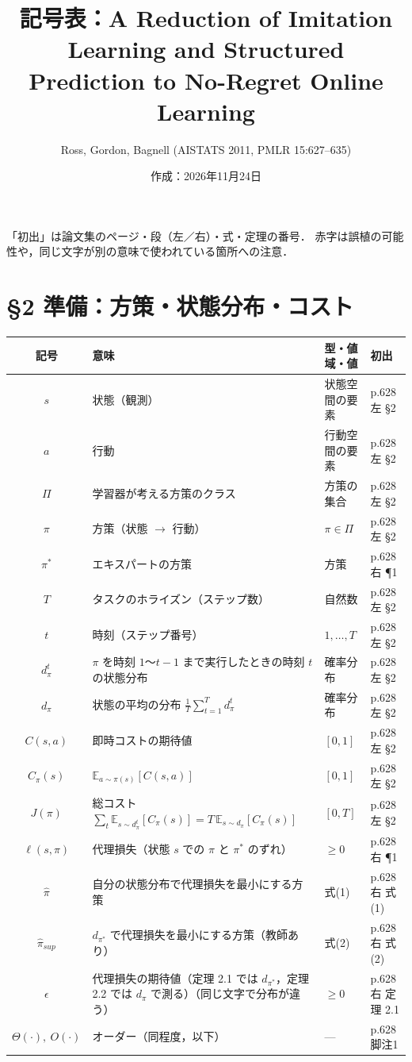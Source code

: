 \documentclass[a4paper,10pt]{ltjsarticle}
\title{記号表：A Reduction of Imitation Learning and Structured Prediction to No-Regret Online Learning}
\author{Ross, Gordon, Bagnell (AISTATS 2011, PMLR 15:627--635)}
\date{作成：2026年11月24日}
\newcommand{\note}[1]{\textcolor{red!70!black}{#1}}
\newcommand{\E}{\mathbb{E}}
\newenvironment{symtab}{%
  \par\noindent\begin{tabular}{SMTP}
  \toprule
  記号 & 意味 & 型・値域・値 & 初出 \\
  \midrule
}{\bottomrule\end{tabular}\par\medskip}
\begin{document}
\maketitle

\noindent
「初出」は論文集のページ・段（左／右）・式・定理の番号．
\note{赤字}は誤植の可能性や，同じ文字が別の意味で使われている箇所への注意．

\section{§2 準備：方策・状態分布・コスト}
\begin{symtab}
$s$ & 状態（観測） & 状態空間の要素 & p.628 左 §2 \\
$a$ & 行動 & 行動空間の要素 & p.628 左 §2 \\
$\Pi$ & 学習器が考える方策のクラス & 方策の集合 & p.628 左 §2 \\
$\pi$ & 方策（状態 $\to$ 行動） & $\pi\in\Pi$ & p.628 左 §2 \\
$\pi^*$ & エキスパートの方策 & 方策 & p.628 右 ¶1 \\
$T$ & タスクのホライズン（ステップ数） & 自然数 & p.628 左 §2 \\
$t$ & 時刻（ステップ番号） & $1,\dots,T$ & p.628 左 §2 \\
$d_\pi^t$ & $\pi$ を時刻 $1$〜$t-1$ まで実行したときの時刻 $t$ の状態分布 & 確率分布 & p.628 左 §2 \\
$d_\pi$ & 状態の平均の分布 $\frac{1}{T}\sum_{t=1}^T d_\pi^t$ & 確率分布 & p.628 左 §2 \\
$C(s,a)$ & 即時コストの期待値 & $[0,1]$ & p.628 左 §2 \\
$C_\pi(s)$ & $\E_{a\sim\pi(s)}[C(s,a)]$ & $[0,1]$ & p.628 左 §2 \\
$J(\pi)$ & 総コスト $\sum_t \E_{s\sim d_\pi^t}[C_\pi(s)] = T\,\E_{s\sim d_\pi}[C_\pi(s)]$ & $[0,T]$ & p.628 左 §2 \\
$\ell(s,\pi)$ & 代理損失（状態 $s$ での $\pi$ と $\pi^*$ のずれ） & $\ge 0$ & p.628 右 ¶1 \\
$\hat\pi$ & 自分の状態分布で代理損失を最小にする方策 & 式(1) & p.628 右 式(1) \\
$\hat\pi_{sup}$ & $d_{\pi^*}$ で代理損失を最小にする方策（教師あり） & 式(2) & p.628 右 式(2) \\
$\epsilon$ & 代理損失の期待値（定理 2.1 では $d_{\pi^*}$，定理 2.2 では $d_\pi$ で測る）\note{（同じ文字で分布が違う）} & $\ge 0$ & p.628 右 定理 2.1 \\
$\Theta(\cdot),\ O(\cdot)$ & オーダー（同程度，以下） & --- & p.628 脚注1 \\
\end{symtab}
\end{document}
